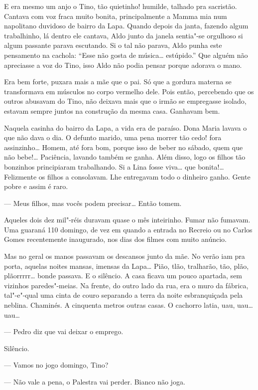 \begin{linenumbers}
E era mesmo um anjo o Tino, tão quietinho! humilde, talhado pra
sacristão. Cantava com voz fraca muito bonita, principalmente a Mamma
mia num napolitano duvidoso de bairro da Lapa. Quando depois da janta,
fazendo algum trabalhinho, lá dentro ele cantava, Aldo junto da janela
sentia"-se orgulhoso si algum passante parava escutando. Si o tal não
parava, Aldo punha este pensamento na cachola: ``Esse não gosta de
música\ldots{} estúpido.'' Que alguém não apreciasse a voz do Tino, isso Aldo
não podia pensar porque adorava o mano.

Era bem forte, puxara mais a mãe que o pai. Só que a gordura materna se
transformava em músculos no corpo vermelho dele. Pois então, percebendo
que os outros abusavam do Tino, não deixava mais que o irmão se
empregasse isolado, estavam sempre juntos na construção da mesma casa.
Ganhavam bem. 

Naquela casinha do bairro da Lapa, a vida era de paraíso. Dona Maria
lavava o que não dava o dia. O defunto marido, uma pena morrer tão cedo!
fora assinzinho\ldots{} Homem, até fora bom, porque isso de beber no sábado,
quem que não bebe!\ldots{} Paciência, lavando também se ganha. Além disso,
logo os filhos tão bonzinhos principiaram trabalhando. Si a Lina fosse
viva\ldots{} que bonita!\ldots{} Felizmente os filhos a consolavam. Lhe entregavam
todo o dinheiro ganho. Gente pobre e assim é raro.

--- Meus filhos, mas vocês podem precisar\ldots{} Então tomem.

Aqueles dois dez mil"-réis duravam quase o mês inteirinho. Fumar não
fumavam. Uma guaraná 110 domingo, de vez em quando a entrada no Recreio
ou no Carlos Gomes recentemente inaugurado, nos dias dos filmes com
muito anúncio.

Mas no geral os manos passavam os descansos junto da mãe. No verão iam
pra porta, aquelas noites mansas, imensas da Lapa\ldots{} Pião, tlão,
tralharão, tão, plão, plãorrrrr\ldots{} bonde passava. E o silêncio. A casa
ficava um pouco apartada, sem vizinhos paredes"-meias. Na frente, do
outro lado da rua, era o muro da fábrica, tal"-e"-qual uma cinta de couro
separando a terra da noite esbranquiçada pela neblina. Chaminés. A
cinquenta metros outras casas. O cachorro latia, uau, uau\ldots{} uau\ldots{}

--- Pedro diz que vai deixar o emprego.

Silêncio.

--- Vamos no jogo domingo, Tino?

--- Não vale a pena, o Palestra vai perder. Bianco não joga.


\end{linenumbers}
